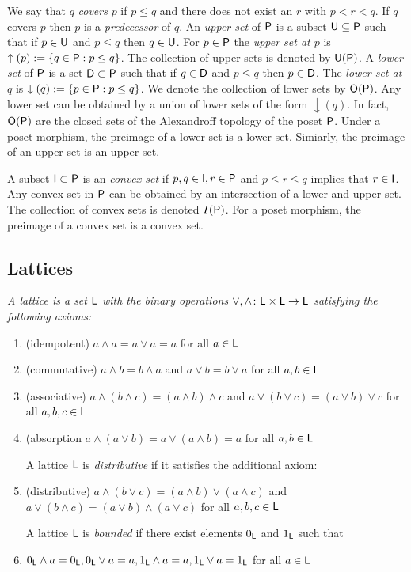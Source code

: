 We say that $q$ {\em covers} $p$ if $p\leq q$ and there does not exist an $r$ with $p< r < q$.  
If $q$ covers $p$ then $p$ is a {\em predecessor} of $q$.   An {\em upper set} of ${\mathsf P}$ is a subset ${\mathsf U}\subseteq {\mathsf P}$ such that if $p\in {\mathsf U}$ and $p\leq q$ then $q\in {\mathsf U}$.  For $p\in {\mathsf P}$ the {\em upper set at $p$} is $\uparrow(p):=\{q\in {\mathsf P}:p \leq q\}$.  The collection of upper sets is denoted by ${\mathsf U}({\mathsf P})$.
A {\em lower set} of ${\mathsf P}$ is a set ${\mathsf D}\subset {\mathsf P}$ such that if $q\in {\mathsf D}$ and $p\leq q$ then $p\in {\mathsf D}$.  The {\em lower set at $q$} is $\downarrow(q):=\{p\in {\mathsf P}: p \leq q\}$.  We denote the collection of lower sets by ${\mathsf O}({\mathsf P})$.  Any lower set can be obtained by a union of lower sets of the form $\downarrow(q)$.  In fact, ${\mathsf O}({\mathsf P})$ are the closed sets of the Alexandroff topology of the poset ${\mathsf P}$.  Under a poset morphism, the preimage of a lower set is a lower set.  Simiarly, the preimage of an upper set is an upper set.

A subset ${\mathsf I}\subset {\mathsf P}$ is an {\em convex set} if $p,q\in {\mathsf I}, r\in {\mathsf P}$ and $ p \leq r \leq q$ implies that $r\in {\mathsf I}$.  Any convex set in ${\mathsf P}$ can be obtained by an intersection of a lower and upper set.  The collection of convex sets is denoted $I({\mathsf P})$.  For a poset morphism, the preimage of a convex set is a convex set.
 


\subsection{Lattices}

\begin{defn}
{\em
A {\em lattice} is a set ${\mathsf L}$ with the binary operations $\vee,\wedge \colon {\mathsf L}\times {\mathsf L}\to {\mathsf L}$ satisfying the following axioms:

\begin{enumerate}
\item (idempotent) $a\wedge a = a \vee a = a$ for all $a\in {\mathsf L}$
\item (commutative) $a\wedge b = b\wedge a$ and $a\vee b = b \vee a$ for all $a,b\in {\mathsf L}$
\item (associative) $a\wedge (b\wedge c) = (a\wedge b)\wedge c$ and $a\vee(b\vee c) = (a\vee b)\vee c$ for all $a,b,c\in {\mathsf L}$
\item (absorption $a\wedge (a\vee b) = a\vee (a\wedge b)=a$ for all $a,b\in {\mathsf L}$

A lattice ${\mathsf L}$ is {\em distributive} if it satisfies the additional axiom:

\item (distributive) $a\wedge (b\vee c) = (a\wedge b)\vee (a\wedge c)$ and $a\vee (b\wedge c) = (a\vee b) \wedge (a\vee c)$ for all $a,b,c\in {\mathsf L}$

A lattice ${\mathsf L}$ is {\em bounded} if there exist elements $0_{\mathsf L}$ and $1_{\mathsf L}$ such that

\item $0_{\mathsf L}\wedge a = 0_{\mathsf L}, 0_{\mathsf L}\vee a = a, 1_{\mathsf L}\wedge a = a, 1_{\mathsf L}\vee a = 1_{\mathsf L}$ for all $a\in {\mathsf L}$
\end{enumerate}
}
\end{defn}

